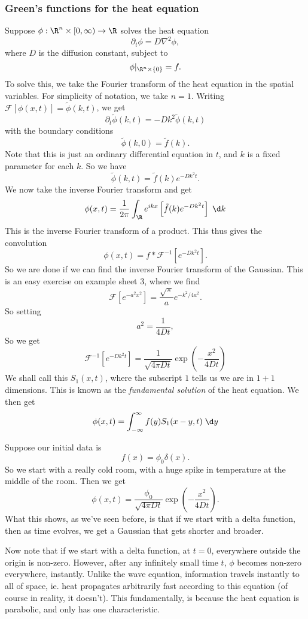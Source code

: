 \documentclass[a4paper]{article}
\begin{document}
\subsubsection*{Green's functions for the heat equation}
Suppose $\phi: \R^n \times [0, \infty) \to \R$ solves the heat equation
\[
  \partial_t \phi = D \nabla^2 \phi,
\]
where $D$ is the diffusion constant, subject to
\[
  \phi|_{\R^n \times \{0\}} = f.
\]
To solve this, we take the Fourier transform of the heat equation in the spatial variables. For simplicity of notation, we take $n = 1$. Writing $\mathcal{F}[\phi(x, t)] = \tilde{\phi}(k, t)$, we get
\[
  \partial_t \tilde{\phi}(k ,t) = -D k^2 \tilde{\phi}(k, t)
\]
with the boundary conditions
\[
  \tilde{\phi}(k, 0) = \tilde{f}(k).
\]
Note that this is just an ordinary differential equation in $t$, and $k$ is a fixed parameter for each $k$. So we have
\[
  \tilde{\phi}(k, t) = \tilde{f}(k) e^{-Dk^2 t}.
\]
We now take the inverse Fourier transform and get
\[
  \phi(x, t) = \frac{1}{2\pi} \int_\R e^{ikx}\left[\tilde{f}(k) e^{-D k^2 t} \right]\;\d k
\]
This is the inverse Fourier transform of a product. This thus gives the convolution
\[
  \phi(x, t) = f * \mathcal{F}^{-1}[e^{-Dk^2 t}].
\]
So we are done if we can find the inverse Fourier transform of the Gaussian. This is an easy exercise on example sheet 3, where we find
\[
  \mathcal{F}[e^{-a^2 x^2}] = \frac{\sqrt{\pi}}{a} e^{-k^2/4a^2}.
\]
So setting
\[
  a^2 = \frac{1}{4Dt},
\]
So we get
\[
  \mathcal{F}^{-1}[e^{-Dk^2 t}] = \frac{1}{\sqrt{4\pi Dt}} \exp\left(-\frac{x^2}{4Dt}\right)
\]
We shall call this $S_1(x, t)$, where the subscript $1$ tells us we are in $1 + 1$ dimensions. This is known as the \emph{fundamental solution} of the heat equation. We then get
\[
  \phi(x, t) = \int_{-\infty}^\infty f(y) S_1(x - y, t) \;\d y
\]
\begin{eg}
  Suppose our initial data is
  \[
    f(x) = \phi_0\delta(x).
  \]
  So we start with a really cold room, with a huge spike in temperature at the middle of the room. Then we get
  \[
    \phi(x, t) = \frac{\phi_0}{\sqrt{4\pi Dt}} \exp\left(-\frac{x^2}{4Dt}\right).
  \]
  What this shows, as we've seen before, is that if we start with a delta function, then as time evolves, we get a Gaussian that gets shorter and broader.

  Now note that if we start with a delta function, at $t = 0$, everywhere outside the origin is non-zero. However, after any infinitely small time $t$, $\phi$ becomes non-zero everywhere, instantly. Unlike the wave equation, information travels instantly to all of space, ie. heat propagates arbitrarily fast according to this equation (of course in reality, it doesn't). This fundamentally, is because the heat equation is parabolic, and only has one characteristic.
\end{eg}
\end{document}
